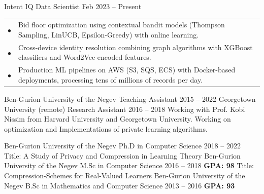 \documentclass[]{awesome-cv}
\begin{document}
\begin{cventries}
	\cventry
	{Intent IQ}
	{Data Scientist}
	{Feb 2023 – Present}
	{}
    {\def\arraystretch{1.15}{\begin{tabular}{ l l }
		$\bullet$ & {Bid floor optimization using contextual bandit models (Thompson Sampling, LinUCB, Epsilon-Greedy) with online learning.} \\
		$\bullet$ & {Cross-device identity resolution combining graph algorithms with XGBoost classifiers and Word2Vec-encoded features.} \\
		$\bullet$ & {Production ML pipelines on AWS (S3, SQS, ECS) with Docker-based deployments, processing tens of millions of records per day.} \\
	\end{tabular}}}
	\cventry
	{Ben-Gurion University of the Negev}
	{Teaching Assistant}
	{2015 – 2022}
	{}
    {}
	\cventry
	{Georgetown University (remote)}
	{Research Assistant}
	{2016 – 2018}
	{}
    {Working with Prof. Kobi Nissim from Harvard University and Georgetown University. \hspace{20em}
    Working on optimization and Implementations of private learning algorithms.}
\end{cventries}
\vspace{-2mm}
\begin{cventries}
	\cventry
	{Ben-Gurion University of the Negev}
	{Ph.D in Computer Science}
	{2018 – 2022}
	{}
	{Title: A Study of Privacy and Compression in Learning Theory}
	\cventry
	{Ben-Gurion University of the Negev}
	{M.Sc in Computer Science}	
    {2016 – 2018}
	{\textbf{GPA: 98}}	    
	{Title: Compression-Schemes for Real-Valued Learners}	
	\cventry
	{Ben-Gurion University of the Negev}	
	{B.Sc in Mathematics and Computer Science}
	{2013 – 2016}
	{\textbf{GPA: 93}}
    {}
\end{cventries}

\vspace{-5mm}
\end{document}
